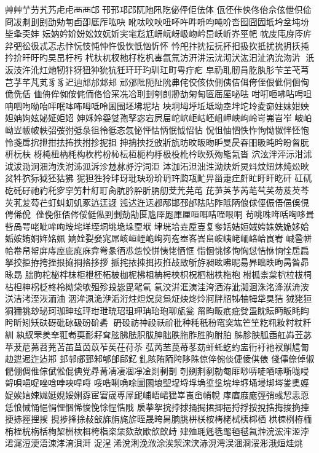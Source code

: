 ⾋艸艼芀艽艿⾌虍⾑襾邙邗邘邛邔阢阤阠阣佖伻佢佉体
佤伾佧佒佟佁佘伭伳伿佡冏冹刜刞刡劭劮匉卣卲厎厏吰吷
吪呔呅吙吜吥吘吽呏呁吨吤呇囮囧囥坁坅坌坉坋坒夆奀妦
妘妠妗妎妢妐妏妧妡宎宒尨尪岍岏岈岋岉岒岊岆岓岕巠帊
帎庋庉庌庈庍弅弝彸彶忒忑忐忭忨忮忳忡忤忣忺忯忷忻怀
忴戺抃抌抎抏抔抇扱扻扺扰抁抈扷扽扲扴旰旴旳旲旵杅杇
杙杕杌杈杝杍杚杋毐氙氚汸汧汫沄沋沏汱汯汩沚汭沇沕沜
汦汳汥汻沎灴灺牣犿犽狃狆狁犺狅玕玗玓玔玒町甹疔疕
皁礽耴肕肙肐肒肜芐芏芅芎芑芓芊芃芄⾘豸迉辿邟邡邥邞
邧邠阰阨阯阭丳侘佼侅佽侀侇佶佴侉侄佷佌侗佪侚佹侁佸
侐侜侔侞侒侂侕佫佮冞冼冾刵刲刳剆刱劼匊匋匼厒厔咇呿
咁咑咂咈呫呺呾呥呬呴呦咍呯呡呠咘呣呧呤囷囹坯坲坭坫
坱坰坶垀坵坻坳坴坢坨坽夌奅妵妺姏姎妲姌姁妶妼姃姖妱
妽姀姈妴姇孢孥宓宕屄屇岮岤岠岵岯岨岬岟岣岭岢岪岧岝
岥岶岰岦帗帔帙弨弢弣弤彔徂彾彽忞忥怭怦怙怲怋怴怊怗
怳怚怞怬怢怍怐怮怓怑怌怉怜戔戽抭抴拑抾抪抶拊抮抳抯
抻抩抰抸攽斨斻昉旼昄昒昈旻昃昋昍昅旽昑昐曶朊枅杬枎
枒杶杻枘枆构杴枍枌杺枟枑枙枃杽极杸杹枔欥殀歾毞氝沓
泬泫泮泙沶泔沭泧沷泐泂沺泃泆泭泲泒泝沴沊沝沀泞泀洰
泍泇沰泹泏泩泑炔炘炅炓炆炄炑炖炂炚炃牪狖狋狘狉狜狒
狔狚狌狑玤玡玭玦玢玠玬玝瓝瓨甿畀甾疌疘皯盳盱盰盵矸
矼矹矻矺矷祂礿秅穸穻竻籵糽耵肏肮肣肸肵肭舠芠苀芫芚
芘芛芵芧芮芼芞芺芴芨芡芩苂芤苃芶芢虰虯虭虮豖迒迋迓
迍迖迕迗邲邴邯邳邰阹阽阼阺陃俍俅俓侲俉俋俁俔俜俙侻
侳俛俇俖侺俀侹俬剄剉勀勂匽卼厗厖厙厘咺咡咭咥哏哃
茍咷咮哖咶哅哆咠呰咼咢咾呲哞咰垵垞垟垤垌垗垝垛垔垘
垏垙垥垚垕壴复奓姡姞姮娀姱姝姺姽姼姶姤姲姷姛姩姳姵
姠姾姴姭宨屌峐峘峌峗峋峛峞峚峉峇峊峖峓峔峏峈峆峎峟
峸巹帡帢帣帠帤庰庤庢庛庣庥弇弮彖徆怷怹恔恲恞恅恓恇
恉恛恌恀恂恟怤恄恘恦恮扂扃拏挍挋拵挎挃拫拹挏挌拸拶
挀挓挔拺挕拻拰敁敃斪斿昶昡昲昵昜昦昢昳昫昺昝昴昹昮
朏朐柁柲柈枺柜枻柸柘柀枷柅柫柤柟枵柍枳柷柶柮柣柂枹
柎柧柰枲柼柆柭柌枮柦柛柺柉柊柃柪柋欨殂殄殶毖毘毠氠
氡洨洴洭洟洼洿洒洊泚洳洄洙洺洚洑洀洝浂洁洘洷洃洏浀
洇洠洬洈洢洉洐炷炟炾炱炰炡炴炵炩牁牉牊牬牰牳牮狊狤
狨狫狟狪狦狣玅珌珂珈珅玹玶玵玴珫玿珇玾珃珆玸珋瓬瓮
甮畇畈疧疪癹盄眈眃眄眅眊盷盻盺矧矨砆砑砒砅砐砏砎砉
砃砓祊祌祋祅祄秕种秏秖秎窀穾竑笀笁籺籸籹籿粀粁紃
紈紁罘羑羍羾耇耎耏耔耷胘胇胠胑胈胂胐胅胣胙胜胊胕胉
胏胗胦胍臿舡芔苙苾苹茇苨茀苕茺苫苖苴苬苡苲苵茌苻苶
苰苪苤苠苺苳苭虷虴虼虳衁衎衧衪衩觓訄訇赲迣迡迮迠郱
邽邿郕郅邾郇郋郈釔釓陔陏陑陓陊陎倞倅倇倓倢倰倛俵
俴倳倷倬俶俷倗倜倠倧倵倯倱倎党冔冓凊凄凅凈凎剡剚剒
剞剟剕剢勍匎厞唦哢唗唒哧哳哤唚哿唄唈哫唑唅哱唊哻哷
哸哠唎唃唋圁圂埌堲埕埒垺埆垽垼垸垶垿埇埐垹埁夎奊娙
娖娭娮娕娏娗娊娞娳孬宧宭宬尃屖屔峬峿峮峱峷崀峹帩帨
庨庮庪庬弳弰彧恝恚恧恁悢悈悀悒悁悝悃悕悛悗悇悜悎戙
扆拲挐捖挬捄捅挶捃揤挹捋捊挼挩捁挴捘捔捙挭捇挳捚捑
挸捗捀捈敊敆旆旃旄旂晊晟晇晑朒朓栟栚桉栲栳栻桋桏栖
栱栜栵栫栭栯桎桄栴栝栒栔栦栨栮桍栺栥栠欬欯欭欱欴歭
肂殈毦毤毨毣毢毧氥浺浣浤浶洍浡涒浘浢浭浯涑涍淯浿涆
浞浧浠涗浰浼浟涂涘洯浨涋浾涀涄洖涃浻浽浵涐烜烓烑
